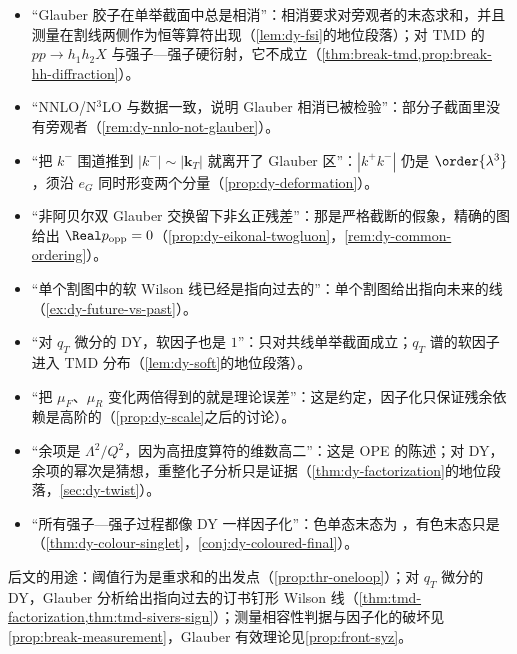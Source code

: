 \begin{tcolorbox}[enhanced,breakable,title=本章涉及的常见误解,fonttitle=\bfseries,
  colback=gray!3!white,colframe=gray!55!black,boxrule=0.6pt,arc=2pt,
  left=5pt,right=5pt,top=3pt,bottom=3pt,before skip=6pt,after skip=6pt]
\small
\begin{itemize}[leftmargin=1.2em,itemsep=0pt,topsep=0pt,parsep=0pt]
\item “Glauber 胶子在单举截面中总是相消”：相消要求对旁观者的末态求和，并且测量在割线两侧作为恒等算符出现（\cref{lem:dy-fsi}的地位段落）；对 TMD 的 $pp\to h_1h_2X$ 与强子—强子硬衍射，它不成立（\cref{thm:break-tmd,prop:break-hh-diffraction}）。
\item “NNLO/N$^3$LO 与数据一致，说明 Glauber 相消已被检验”：部分子截面里没有旁观者（\cref{rem:dy-nnlo-not-glauber}）。
\item “把 $k^-$ 围道推到 $|k^-|\sim|\mathbf k_T|$ 就离开了 Glauber 区”：$|k^+k^-|$ 仍是 $\order{\lambda^3}$，须沿 $e_G$ 同时形变两个分量（\cref{prop:dy-deformation}）。
\item “非阿贝尔双 Glauber 交换留下非幺正残差”：那是严格截断的假象，精确的图给出 $\Real p_{\rm opp}=0$（\cref{prop:dy-eikonal-twogluon}，\cref{rem:dy-common-ordering}）。
\item “单个割图中的软 Wilson 线已经是指向过去的”：单个割图给出指向未来的线（\cref{ex:dy-future-vs-past}）。
\item “对 $q_T$ 微分的 DY，软因子也是 $1$”：只对共线单举截面成立；$q_T$ 谱的软因子进入 TMD 分布（\cref{lem:dy-soft}的地位段落）。
\item “把 $\mu_F$、$\mu_R$ 变化两倍得到的就是理论误差”：这是约定，因子化只保证残余依赖是高阶的（\cref{prop:dy-scale}之后的讨论）。
\item “余项是 $\Lambda^2/Q^2$，因为高扭度算符的维数高二”：这是 OPE 的陈述；对 DY，余项的幂次是猜想，重整化子分析只是证据（\cref{thm:dy-factorization}的地位段落，\cref{sec:dy-twist}）。
\item “所有强子—强子过程都像 DY 一样因子化”：色单态末态为 \tagA，有色末态只是 \tagC（\cref{thm:dy-colour-singlet}，\cref{conj:dy-coloured-final}）。
\end{itemize}
\end{tcolorbox}

后文的用途：阈值行为是重求和的出发点（\cref{prop:thr-oneloop}）；对 $q_T$ 微分的 DY，Glauber 分析给出指向过去的订书钉形 Wilson 线（\cref{thm:tmd-factorization,thm:tmd-sivers-sign}）；测量相容性判据与因子化的破坏见\cref{prop:break-measurement}，Glauber 有效理论见\cref{prop:front-syz}。
